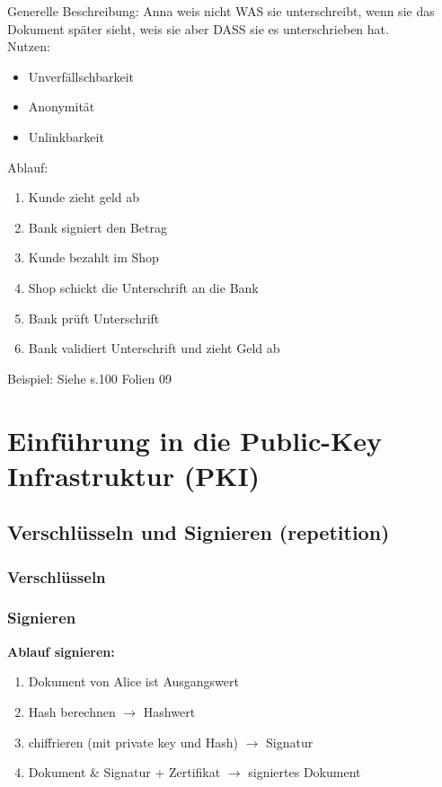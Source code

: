 \documentclass[12pt]{scrartcl}
\begin{document}
Generelle Beschreibung: Anna weis nicht WAS sie unterschreibt, wenn sie das Dokument später sieht,
weis sie aber DASS sie es unterschrieben hat.\\
Nutzen:
\begin{itemize}
    \item Unverfällschbarkeit
    \item Anonymität
    \item Unlinkbarkeit
\end{itemize}

\vspace{0.5cm}
\noindent
Ablauf:
\label{sec:dinimam}
\begin{enumerate}
    \item Kunde zieht geld ab
    \item Bank signiert den Betrag
    \item Kunde bezahlt im Shop
    \item Shop schickt die Unterschrift an die Bank
    \item Bank prüft Unterschrift
    \item Bank validiert Unterschrift und zieht Geld ab
\end{enumerate}

\vspace{0.5cm}
Beispiel: Siehe s.100 Folien 09


\section{Einführung in die Public-Key Infrastruktur (PKI)}

\subsection{Verschlüsseln und Signieren (repetition)}


\subsubsection{Verschlüsseln}

\subsubsection{Signieren}

\textbf{Ablauf signieren:}

\begin{enumerate}
    \item Dokument von Alice ist Ausgangswert
    \item Hash berechnen $\rightarrow$ Hashwert
    \item chiffrieren (mit private key und Hash) $\rightarrow$ Signatur
    \item Dokument \& Signatur + Zertifikat $\rightarrow$ signiertes Dokument
\end{enumerate}
\end{document}
